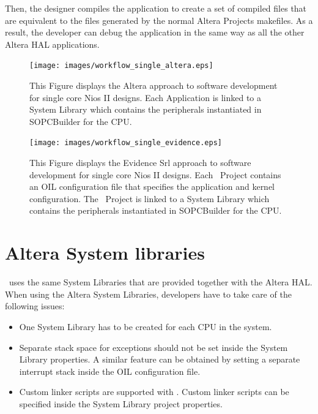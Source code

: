 Then, the designer compiles the application to create a set of
compiled files that are equivalent to the files generated by the
normal Altera Projects makefiles. As a result, the developer can debug
the application in the same way as all the other Altera HAL
applications.



%
\begin{figure}
\texttt{[image: images/workflow\_single\_altera.eps]}
\caption{\label{fig:altera-single-workflow}This Figure displays the
Altera approach to software development for single core Nios II
designs. Each Application is linked to a System Library which contains
the peripherals instantiated in SOPCBuilder for the CPU.}
\end{figure}

%
\begin{figure}
\texttt{[image: images/workflow\_single\_evidence.eps]}
\caption{\label{fig:evidence-single-workflow}This Figure displays the
Evidence Srl approach to software development for single core Nios II
designs. Each \rtd\ Project contains an OIL configuration file that
specifies the application and kernel configuration. The \rtd\ Project
is linked to a System Library which contains the peripherals
instantiated in SOPCBuilder for the CPU.}
\end{figure}






\section[System libraries]{Altera System libraries}

\ee\ uses the same System Libraries that are provided together with the
Altera HAL. When using the Altera System Libraries, developers have to
take care of the following issues:

\begin{itemize}
\item One System Library has to be created for each CPU in the system.

\item Separate stack space for exceptions should not be set inside the
  System Library properties. A similar feature can be obtained by
  setting a separate interrupt stack inside the OIL configuration
  file.

\item Custom linker scripts are supported with \ee.  Custom linker
  scripts can be specified inside the System Library project
  properties.
\end{itemize}


